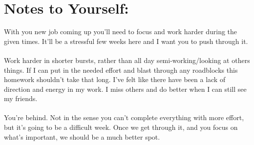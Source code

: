 \documentclass[11pt]{article}
\begin{document}
\section*{Notes to Yourself:}
With you new job coming up you'll need to focus and work harder during the given times. It'll be a stressful few weeks here and I want you to push through it.\\
\\
Work harder in shorter bursts, rather than all day semi-working/looking at others things. If I can put in the needed effort and blast through any roadblocks this homework shouldn't take that long. I've felt like there have been a lack of direction and energy in my work. I miss others and do better when I can still see my friends. \\
\\
You're behind. Not in the sense you can't complete everything with more effort, but it's going to be a difficult week. Once we get through it, and you focus on what's important, we should be a much better spot.\\
\end{document}
